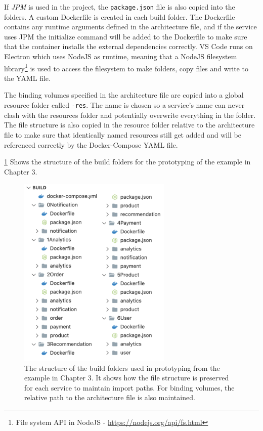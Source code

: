 If \emph{JPM} is used in the project, the \texttt{package.json} file is also copied into the folders.
A custom Dockerfile is created in each build folder. The Dockerfile contains any runtime arguments defined in the architecture file, and if the service uses JPM the initialize command will be added to the Dockerfile to make sure that the container installs the external dependencies correctly.
VS Code runs on Electron which uses NodeJS as runtime, meaning that a NodeJS filesystem library\footnote{File system API in NodeJS - \url{https://nodejs.org/api/fs.html}} is used to access the filesystem to make folders, copy files and write to the YAML file.

The binding volumes specified in the architecture file are copied into a global resource folder called \texttt{-res}. The name is chosen so a service's name can never clash with the resources folder and potentially overwrite everything in the folder.
The file structure is also copied in the resource folder relative to the architecture file to make sure that identically named resources still get added and will be referenced correctly by the Docker-Compose YAML file.

\cref{figure:buildfolder_structure} Shows the structure of the build folders for the prototyping of the example in Chapter 3.  

\begin{figure}[t]
    \center
    \includegraphics[width=0.65\textwidth]{figures/bf.png}
    \caption{The structure of the build folders used in prototyping from the example in Chapter 3. It shows how the file structure is preserved for each service to maintain import paths. For binding volumes, the relative path to the architecture file is also maintained.}
    \label{figure:buildfolder_structure}
\end{figure}